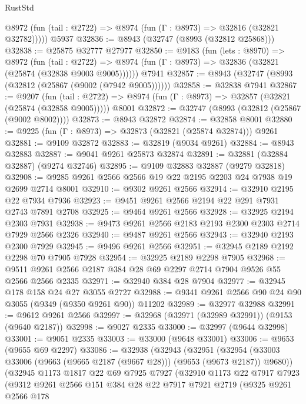 \begin{lexlean}{RustStd}
\begin{coremodule}
      @8972 (fun (tail : @2722) => @8974 (fun (Γ : @8973) => @32816 (@32821 @32782)))))
    @5937
@32836 := @8943 (@32747 (@8993 (@32812 @25868)))
@32838 := @25875 @32777 @27977
@32850 := @9183
    (fun (lets : @8970) =>
    @8972
      (fun (tail : @2722) =>
      @8974 (fun (Γ : @8973) => @32836 (@32821 (@25874 (@32838 @9003 @9005))))))
    @7941
@32857 := @8943 (@32747 (@8993 (@32812 (@25867 (@9002 (@7942 @9005))))))
@32858 := @32838 @7941
@32867 := @9207
    (fun (tail : @2722) => @8974 (fun (Γ : @8973) => @32857 (@32821 (@25874 (@32858 @9005)))))
    @8001
@32872 := @32747 (@8993 (@32812 (@25867 (@9002 @8002))))
@32873 := @8943 @32872
@32874 := @32858 @8001
@32880 := @9225 (fun (Γ : @8973) => @32873 (@32821 (@25874 @32874))) @9261
@32881 := @9109 @32872
@32883 := @32819 (@9034 @9261)
@32884 := @8943 @32883
@32887 := @9041 @9261 @25873 @32874
@32891 := @32881 (@32884 @32887) (@9274 @32746)
@32895 := @9109 @32883 @32887 (@9279 @32818)
@32908 := @9285 @9261 @2566 @2566 @19 @22 @2195 @2203 @24 @7938 @19 @2699 @2714 @8001
@32910 := @9302 @9261 @2566
@32914 := @32910 @2195 @22 @7934 @7936
@32923 := @9451 @9261 @2566 @2194 @22 @291 @7931 @2743 @7891 @2708
@32925 := @9464 @9261 @2566
@32928 := @32925 @2194 @2303 @7931
@32938 := @9473 @9261 @2566 @2183 @2193 @2300 @2303 @2714 @7929 @2566 @2326
@32940 := @9487 @9261 @2566
@32943 := @32940 @2193 @2300 @7929
@32945 := @9496 @9261 @2566
@32951 := @32945 @2189 @2192 @2298 @70 @7905 @7928
@32954 := @32925 @2189 @2298 @7905
@32968 := @9511 @9261 @2566 @2187 @384 @28 @69 @2297 @2714 @7904 @9526 @55 @2566 @2566 @2335
@32971 := @32940 @384 @28 @7904
@32977 := @32945 @178 @158 @24 @27 @3055 @2727
@32988 := @9341 @9261 @2566 @90 @24 @90 @3055 (@9349 (@9350 @9261 @90)) @11202
@32989 := @32977 @32988
@32991 := @9612 @9261 @2566
@32997 := @32968 (@32971 (@32989 @32991)) (@9153 (@9640 @2187))
@32998 := @9027 @2335
@33000 := @32997 (@9644 @32998)
@33001 := @9051 @2335
@33003 := @33000 (@9648 @33001)
@33006 := @9653 (@9655 @69 @2297)
@33086 := @32938
    (@32943
      (@32951
        (@32954 (@33003 @33006 (@9663 (@9665 @2187 (@9667 @28))) (@9653 (@9673 @2187)) @9680))
        (@32945
          @1173
          @1817
          @22
          @69
          @7925
          @7927
          (@32910
            @1173
            @22
            @7917
            @7923
            (@9312
              @9261
              @2566
              @151
              @384
              @28
              @22
              @7917
              @7921
              @2719
              (@9325
                @9261
                @2566
                @178

\end{coremodule}
\end{lexlean}
